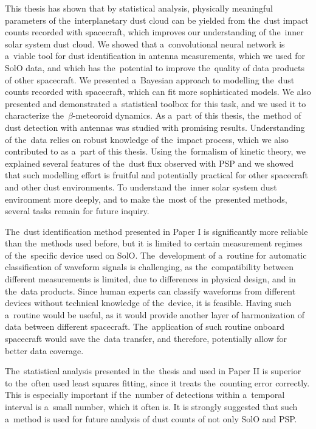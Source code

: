 This thesis has shown that by statistical analysis, physically meaningful parameters of the~interplanetary dust cloud can be yielded from the~dust impact counts recorded with spacecraft, which improves our understanding of the~inner solar system dust cloud. We showed that a~convolutional neural network is a~viable tool for dust identification in antenna measurements, which we used for SolO data, and which has the~potential to improve the~quality of data products of other spacecraft. We presented a~Bayesian approach to modelling the~dust counts recorded with spacecraft, which can fit more sophisticated models. We also presented and demonstrated a~statistical toolbox for this task, and we used it to characterize the~$\beta$-meteoroid dynamics. As a~part of this thesis, the~method of dust detection with antennas was studied with promising results. Understanding of the~data relies on robust knowledge of the~impact process, which we also contributed to as a~part of this thesis. Using the~formalism of kinetic theory, we explained several features of the~dust flux observed with PSP and we showed that such modelling effort is fruitful and potentially practical for other spacecraft and other dust environments. To understand the~inner solar system dust environment more deeply, and to make the~most of the~presented methods, several tasks remain for future inquiry. 

The~dust identification method presented in Paper I is significantly more reliable than the~methods used before, but it is limited to certain measurement regimes of the~specific device used on SolO. The~development of a~routine for automatic classification of waveform signals is challenging, as the~compatibility between different measurements is limited, due to differences in physical design, and in the~data products. Since human experts can classify waveforms from different devices without technical knowledge of the~device, it is feasible. Having such a~routine would be useful, as it would provide another layer of harmonization of data between different spacecraft. The~application of such routine onboard spacecraft would save the~data transfer, and therefore, potentially allow for better data coverage. 

The~statistical analysis presented in the~thesis and used in Paper II is superior to the~often used least squares fitting, since it treats the~counting error correctly. This is especially important if the~number of detections within a~temporal interval is a~small number, which it often is. It is strongly suggested that such a~method is used for future analysis of dust counts of not only SolO and PSP. 

